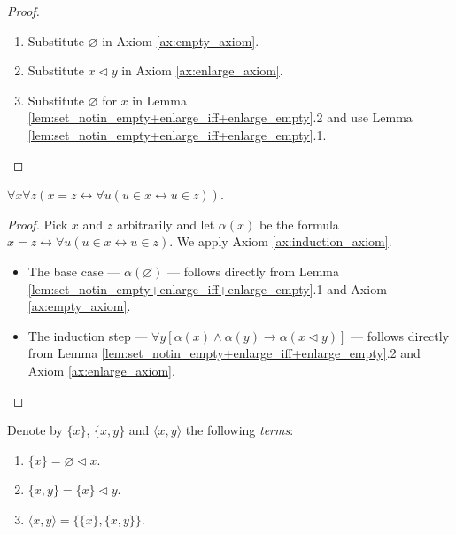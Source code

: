 \begin{proof}
    \leanok
    \leavevmode
    \begin{enumerate}
        \item Substitute $\varnothing$ in Axiom \ref{ax:empty_axiom}.
        \item Substitute $x \lhd y$ in Axiom \ref{ax:enlarge_axiom}.
        \item Substitute $\varnothing$ for $x$ in Lemma \ref{lem:set_notin_empty+enlarge_iff+enlarge_empty}.2 and use Lemma \ref{lem:set_notin_empty+enlarge_iff+enlarge_empty}.1.
    \end{enumerate}
\end{proof}

\begin{theorem}
    \label{thm:exten_prop}
    \leanok
    $\forall x \forall z (x=z \leftrightarrow \forall u (u \in x \leftrightarrow u \in z))$.
\end{theorem}

\begin{proof}
    \leanok
    Pick $x$ and $z$ arbitrarily and let $\alpha (x)$ be the formula $x=z \leftrightarrow \forall u (u \in x \leftrightarrow u \in z)$.
    We apply Axiom \ref{ax:induction_axiom}.
    \begin{itemize}
        \item The base case — $\alpha (\varnothing)$ — follows directly from Lemma \ref{lem:set_notin_empty+enlarge_iff+enlarge_empty}.1 and Axiom \ref{ax:empty_axiom}.
        \item The induction step — $\forall y[\alpha(x) \land \alpha(y) \rightarrow \alpha(x \lhd y)]$ — 
        follows directly from Lemma \ref{lem:set_notin_empty+enlarge_iff+enlarge_empty}.2 and Axiom \ref{ax:enlarge_axiom}.
    \end{itemize}
\end{proof}

\begin{definition}
    \label{def:Single+Pair+OrdPair}
    \leanok
    Denote by $\{x\}$, $\{x,y\}$ and $\langle x,y\rangle$ the following \textit{terms}:
    \begin{enumerate}
        \item $\{x\} = \varnothing \lhd x$.
        \item $\{x,y\} = \{x\} \lhd y$.
        \item $\langle x,y\rangle = \{\{x\}, \{x,y\}\}$.
    \end{enumerate}
\end{definition}

